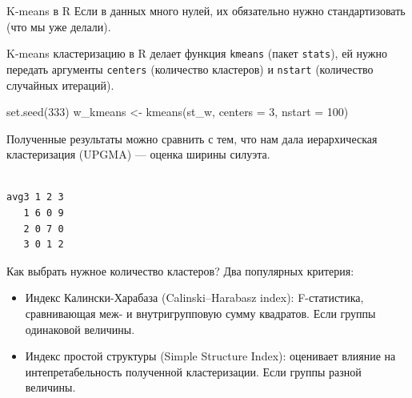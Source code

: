 \documentclass[
  ignorenonframetext,
  russian,
]{beamer}
\newenvironment{Shaded}{\begin{snugshade}}{\end{snugshade}}
\newcommand{\AttributeTok}[1]{\textcolor[rgb]{0.40,0.45,0.13}{#1}}
\newcommand{\DecValTok}[1]{\textcolor[rgb]{0.68,0.00,0.00}{#1}}
\newcommand{\FunctionTok}[1]{\textcolor[rgb]{0.28,0.35,0.67}{#1}}
\newcommand{\NormalTok}[1]{\textcolor[rgb]{0.00,0.23,0.31}{#1}}
\newcommand{\OtherTok}[1]{\textcolor[rgb]{0.00,0.23,0.31}{#1}}
\newcommand{\SpecialCharTok}[1]{\textcolor[rgb]{0.37,0.37,0.37}{#1}}
\begin{document}
\begin{frame}[fragile]{K-means в R}
\protect{}\label{k-means-ux432-r}
Если в данных много нулей, их обязательно нужно стандартизовать (что мы
уже делали).

K-means кластеризацию в R делает функция \texttt{kmeans} (пакет
\texttt{stats}), ей нужно передать аргументы \texttt{centers}
(количество кластеров) и \texttt{nstart} (количество случайных
итераций).

\begin{Shaded}
\begin{Highlighting}[]
\FunctionTok{set.seed}\NormalTok{(}\DecValTok{333}\NormalTok{)}
\NormalTok{w\_kmeans }\OtherTok{\textless{}{-}} \FunctionTok{kmeans}\NormalTok{(st\_w, }\AttributeTok{centers =} \DecValTok{3}\NormalTok{, }\AttributeTok{nstart =} \DecValTok{100}\NormalTok{)}
\end{Highlighting}
\end{Shaded}

Полученные результаты можно сравнить с тем, что нам дала иерархическая
кластеризация (UPGMA) --- оценка ширины силуэта.

\begin{Shaded}
\end{Shaded}

\begin{verbatim}
    
avg3 1 2 3
   1 6 0 9
   2 0 7 0
   3 0 1 2
\end{verbatim}
\end{frame}

\begin{frame}{Как выбрать нужное количество кластеров?}
\protect{}\label{ux43aux430ux43a-ux432ux44bux431ux440ux430ux442ux44c-ux43dux443ux436ux43dux43eux435-ux43aux43eux43bux438ux447ux435ux441ux442ux432ux43e-ux43aux43bux430ux441ux442ux435ux440ux43eux432}
Два популярных критерия:

\begin{itemize}
\item
  Индекс Калински-Харабаза (Calinski--Harabasz index): F-статистика,
  сравнивающая меж- и внутригрупповую сумму квадратов. Если группы
  одинаковой величины.
\item
  Индекс простой структуры (Simple Structure Index): оценивает влияние
  на интепретабельность полученной кластеризации. Если группы разной
  величины.
\end{itemize}
\end{frame}
\end{document}
